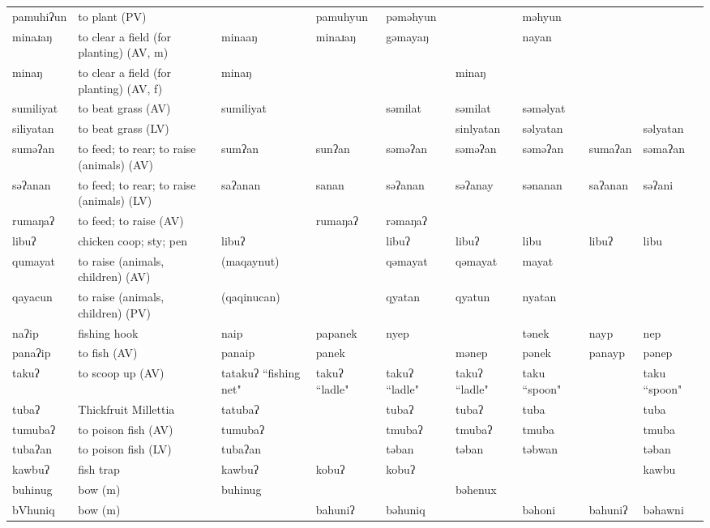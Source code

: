 \begin{landscape}
\begin{longtable}{*{9}{p{}}}
\text{*}pamuhiʔun & to plant (PV) &  & pamuhyun & pəməhyun &  & məhyun &  & \\
\text{*}minaɹaŋ & to clear a field (for planting) (AV, m) & minaaŋ & minaɹaŋ & gəmayaŋ &  & nayan &  & \\
\text{*}minaŋ & to clear a field (for planting) (AV, f) & minaŋ &  &  & minaŋ &  &  & \\
\text{*}sumiliyat & to beat grass (AV) & sumiliyat &  & səmilat & səmilat & səməlyat &  & \\
\text{*}siliyatan & to beat grass (LV) &  &  &  & sinlyatan & səlyatan &  & səlyatan\\
\text{*}suməʔan & to feed; to rear; to raise (animals) (AV) & sumʔan & sunʔan & səməʔan & səməʔan & səməʔan & sumaʔan & səmaʔan\\
\text{*}səʔanan & to feed; to rear; to raise (animals) (LV) & saʔanan & sanan & səʔanan & səʔanay & sənanan & saʔanan & səʔani\\
\text{*}rumaŋaʔ & to feed; to raise (AV) &  & rumaŋaʔ & rəmaŋaʔ &  &  &  & \\
\text{*}libuʔ & chicken coop; sty; pen & libuʔ &  & libuʔ & libuʔ & libu & libuʔ & libu\\
\text{*}qumayat & to raise (animals, children) (AV) & (maqaynut) &  & qəmayat & qəmayat & mayat &  & \\
\text{*}qayacun & to raise (animals, children) (PV) & (qaqinucan) &  & qyatan & qyatun & nyatan &  & \\
\text{*}naʔip & fishing hook & naip & papanek & nyep &  & tənek & nayp & nep\\
\text{*}panaʔip & to fish (AV) & panaip & panek &  & mənep & pənek & panayp & pənep\\
\text{*}takuʔ & to scoop up (AV) & tatakuʔ ``fishing net" & takuʔ ``ladle" & takuʔ ``ladle" & takuʔ ``ladle" & taku ``spoon" &  & taku ``spoon"\\
\text{*}tubaʔ & Thickfruit Millettia & tatubaʔ &  & tubaʔ & tubaʔ & tuba &  & tuba\\
\text{*}tumubaʔ & to poison fish (AV) & tumubaʔ &  & tmubaʔ & tmubaʔ & tmuba &  & tmuba\\
\text{*}tubaʔan & to poison fish (LV) & tubaʔan &  & təban & təban & təbwan &  & təban\\
\text{*}kawbuʔ & fish trap & kawbuʔ & kobuʔ & kobuʔ &  &  &  & kawbu\\
\text{*}buhinug & bow (m) & buhinug &  &  & bəhenux &  &  & \\
\text{*}bVhuniq & bow (m) &  & bahuniʔ & bəhuniq &  & bəhoni & bahuniʔ & bəhawni\\

\end{longtable}
\end{landscape}
